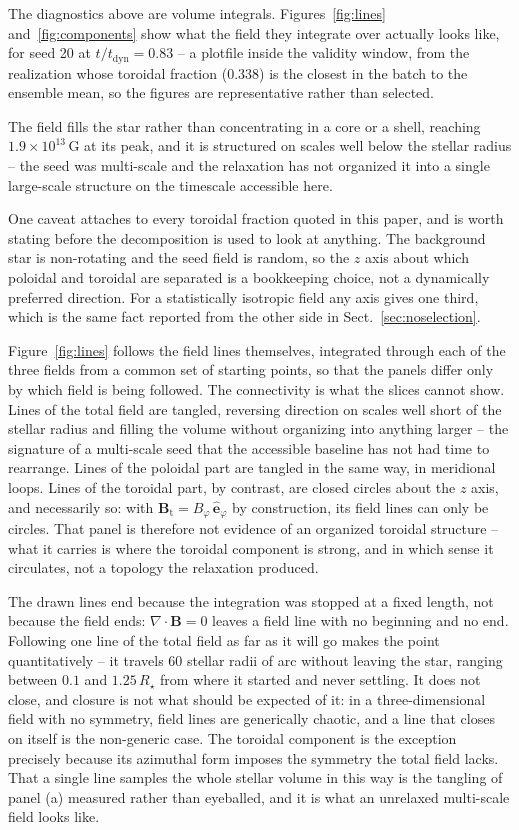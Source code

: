 \documentclass{aa}
\begin{document}
The diagnostics above are volume integrals. Figures~\ref{fig:lines}
and~\ref{fig:components} show what the field they integrate over actually
looks like, for seed 20 at $t/t_{\mathrm{dyn}} = 0.83$ -- a plotfile
inside the validity window, from the realization whose toroidal fraction
($0.338$) is the closest in the batch to the ensemble mean, so the figures
are representative rather than selected.

The field fills the star rather than concentrating in a core or a shell,
reaching $1.9\times10^{13}$\,G at its peak, and it is structured on scales
well below the stellar radius -- the seed was multi-scale and the
relaxation has not organized it into a single large-scale structure on the
timescale accessible here.

One caveat attaches to every toroidal fraction quoted in this paper, and
is worth stating before the decomposition is used to look at anything.
The background star is non-rotating and the seed field is random, so the
$z$ axis about which poloidal and toroidal are separated is a bookkeeping
choice, not a dynamically preferred direction. For a statistically
isotropic field any axis gives one third, which is the same fact reported
from the other side in Sect.~\ref{sec:noselection}.

Figure~\ref{fig:lines} follows the field lines themselves, integrated
through each of the three fields from a common set of starting points, so
that the panels differ only by which field is being followed. The
connectivity is what the slices cannot show. Lines of the total field are
tangled, reversing direction on scales well short of the stellar radius
and filling the volume without organizing into anything larger -- the
signature of a multi-scale seed that the accessible baseline has not had
time to rearrange. Lines of the poloidal part are tangled in the same
way, in meridional loops. Lines of the toroidal part, by contrast, are
closed circles about the $z$ axis, and necessarily so: with
$\mathbf{B}_{\mathrm{t}} = B_\varphi\,\hat{\mathbf{e}}_\varphi$ by
construction, its field lines can only be circles. That panel is
therefore not evidence of an organized toroidal structure -- what it
carries is where the toroidal component is strong, and in which sense it
circulates, not a topology the relaxation produced.

The drawn lines end because the integration was stopped at a fixed
length, not because the field ends: $\nabla\!\cdot\!\mathbf{B} = 0$ leaves
a field line with no beginning and no end. Following one line of the
total field as far as it will go makes the point quantitatively -- it
travels $60$ stellar radii of arc without leaving the star, ranging
between $0.1$ and $1.25\,R_\star$ from where it started and never
settling. It does not close, and closure is not what should be expected
of it: in a three-dimensional field with no symmetry, field lines are
generically chaotic, and a line that closes on itself is the non-generic
case. The toroidal component is the exception precisely because its
azimuthal form imposes the symmetry the total field lacks. That a single
line samples the whole stellar volume in this way is the tangling of
panel (a) measured rather than eyeballed, and it is what an unrelaxed
multi-scale field looks like.
\end{document}
